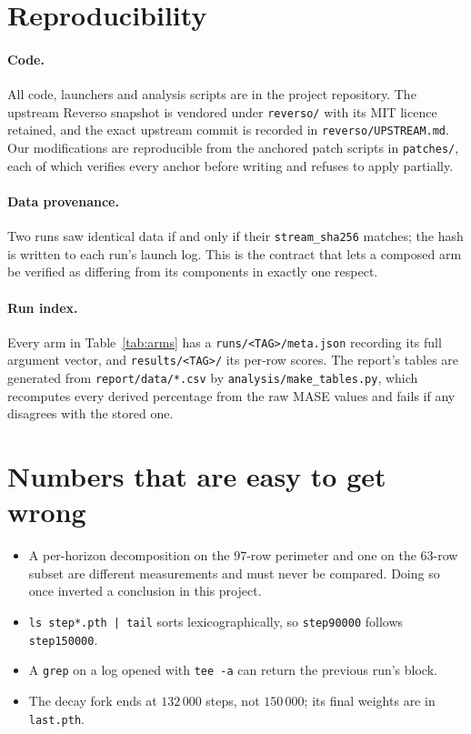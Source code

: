 \section{Reproducibility}
\label{app:repro}

\paragraph{Code.} All code, launchers and analysis scripts are in the project
repository. The upstream Reverso snapshot is vendored under \texttt{reverso/}
with its MIT licence retained, and the exact upstream commit is recorded in
\texttt{reverso/UPSTREAM.md}. Our modifications are reproducible from the
anchored patch scripts in \texttt{patches/}, each of which verifies every
anchor before writing and refuses to apply partially.

\paragraph{Data provenance.} Two runs saw identical data if and only if their
\texttt{stream\_sha256} matches; the hash is written to each run's launch log.
This is the contract that lets a composed arm be verified as differing from its
components in exactly one respect.

\paragraph{Run index.} Every arm in Table~\ref{tab:arms} has a
\texttt{runs/<TAG>/meta.json} recording its full argument vector, and
\texttt{results/<TAG>/} its per-row scores. The report's tables are generated
from \texttt{report/data/*.csv} by \texttt{analysis/make\_tables.py}, which
recomputes every derived percentage from the raw MASE values and fails if any
disagrees with the stored one.

\section{Numbers that are easy to get wrong}
\label{app:pitfalls}

\begin{itemize}
  \item A per-horizon decomposition on the $97$-row perimeter and one on the
        $63$-row subset are different measurements and must never be compared.
        Doing so once inverted a conclusion in this project.
  \item \texttt{ls step*.pth | tail} sorts lexicographically, so
        \texttt{step90000} follows \texttt{step150000}.
  \item A \texttt{grep} on a log opened with \texttt{tee -a} can return the
        previous run's block.
  \item The decay fork ends at $132\,000$ steps, not $150\,000$; its final
        weights are in \texttt{last.pth}.
\end{itemize}

